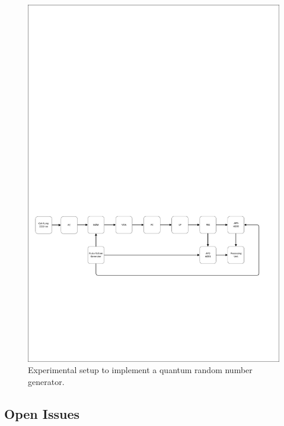 \begin{figure}[H]
    \centering
        \includegraphics[clip, trim=0.5cm 7cm 0.5cm 17cm, width=1.00\textwidth]{./sdf/qrng/figures_raw/experimental_qrng.pdf}
    \caption{Experimental setup to implement a quantum random number generator.}\label{experimental_qrng}
\end{figure}


\subsection{Open Issues}

\newpage



\renewcommand{\bibname}{References}
%


%
%


\cleardoublepage
